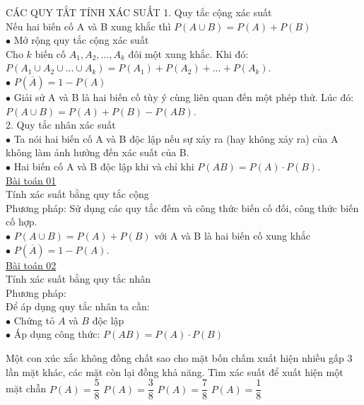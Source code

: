 \begin{dang}{CÁC QUY TẮT TÍNH XÁC SUẤT}
1. Quy tắc cộng xác suất\\
Nếu hai biến cố A và B xung khắc thì $P(A\cup B)=P(A)+P(B)$\\
$\bullet $ Mở rộng quy tắc cộng xác suất\\
Cho $k$ biến cố $A_1,A_2,\ldots ,A_k$ đôi một xung khắc. Khi đó:\\
$P(A_1\cup A_2\cup \ldots \cup A_k)=P(A_1)+P(A_2)+\ldots +P(A_k)$.\\
$\bullet $ $P(\overline{A})=1-P(A)$\\
$\bullet $ Giải sử A và B là hai biến cố tùy ý cùng liên quan đến một phép thử. Lúc đó: $P(A\cup B)=P(A)+P(B)-P(AB)$.\\
2. Quy tắc nhân xác suất\\
$\bullet $ Ta nói hai biến cố A và B độc lập nếu sự xảy ra (hay không xảy ra) của A không làm ảnh hưởng đến xác suất của B. \\
$\bullet $ Hai biến cố A và B độc lập khi và chỉ khi $P(AB)=P(A)\cdot P(B)$.\\
\underline{Bài toán 01}\\
Tính xác suất bằng quy tắc cộng\\
Phương pháp: Sử dụng các quy tắc đếm và công thức biến cố đối, công thức biến cố hợp.\\
$\bullet $ $P(A\cup B)=P(A)+P(B)$ với A và B là hai biến cố xung khắc\\
$\bullet $ $P(\overline{A})=1-P(A)$.\\
\underline{Bài toán 02}\\
Tính xác suất bằng quy tắc nhân\\
Phương pháp:\\
Để áp dụng quy tắc nhân ta cần:\\
 $\bullet $ Chứng tỏ $A$ và $B$ độc lập\\
 $\bullet $ Áp dụng công thức: $P(AB)=P(A) \cdot P(B)$
\end{dang}
\begin{ex}
Một con xúc xắc không đồng chất sao cho mặt bốn chấm xuất hiện nhiều gấp 3 lần mặt khác, các mặt còn lại đồng khả năng. Tìm xác suất để xuất hiện một mặt chẵn
\choice
{\True $P(A)=\dfrac{5}{8}$}
{$P(A)=\dfrac{3}{8}$}
{$P(A)=\dfrac{7}{8}$}
{$P(A)=\dfrac{1}{8}$}
\end{ex}
